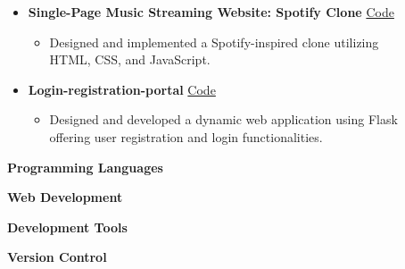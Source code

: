 \documentclass[10pt,a4paper,ragged2e,withhyper]{altacv}
\begin{document}
\begin{paracol}{2}
\begin{itemize}
    \item {\color{black} \normalsize \textbf{Single-Page Music Streaming Website: Spotify Clone}} \hfill {\color{accent} \faGithub \href{https://github.com/atharao/Spotify_Clone}{ \hspace{0.5mm}Code}}
    \begin{itemize}
        \item  Designed and implemented a Spotify-inspired clone utilizing \\HTML, CSS, and JavaScript.
    \end{itemize}
    
    \item {\color{black} \normalsize \textbf{Login-registration-portal}} \hfill {\color{accent} \faGithub \href{https://github.com/atharao/Login-registration-portal-updated}{ \hspace{0.5mm}Code}}
    \begin{itemize}
        \item Designed and developed a dynamic web application using Flask \\offering user registration and login functionalities.
    \end{itemize}
\end{itemize}


\switchcolumn


{\color{black} \normalsize\textbf{Programming Languages}


\divider\smallskip

\textbf{Web Development}


\divider\smallskip

\textbf{Development Tools}


\divider\smallskip

\textbf{Version Control}


\\
\\



}
\end{paracol}
\end{document}

